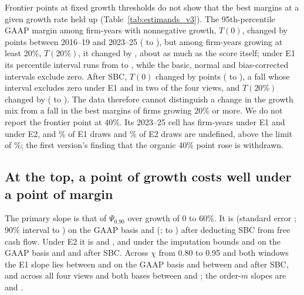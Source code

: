 Frontier points at fixed growth thresholds do not show that the best margins at a given growth rate held up (Table~\ref{tab:estimands_v3}). The 95th-percentile GAAP margin among firm-years with nonnegative growth, $T(0)$, changed by \TzeroOp{} points between 2016--19 and 2023--25 (\TzeroOpLo{} to \TzeroOpHi), but among firm-years growing at least 20\%, $T(20\%)$, it changed by \TtwentyOp{}, about as much as the score itself; under E1 its percentile interval runs from \TtwentyOpLo{} to \TtwentyOpHi, while the basic, normal and bias-corrected intervals exclude zero. After SBC, $T(0)$ changed by \TzeroCash{} points (\TzeroCashLo{} to \TzeroCashHi), a fall whose interval excludes zero under E1 and in two of the four views, and $T(20\%)$ changed by \TtwentyCash{} (\TtwentyCashLo{} to \TtwentyCashHi). The data therefore cannot distinguish a change in the growth mix from a fall in the best margins of firms growing 20\% or more. We do not report the frontier point at 40\%. Its 2023--25 cell has \FortyCellLate{} firm-years under E1 and \FortyCellLateEtwo{} under E2, and \FortyNanEone\% of E1 draws and \FortyNanEtwo\% of E2 draws are undefined, above the limit of \BootNanMax\%; the first version's finding that the organic 40\% point rose is withdrawn.

\subsection{At the top, a point of growth costs well under a point of margin}
The primary slope is that of $\Psi_{0.90}$ over growth of 0 to 60\%. It is \PsiOpEone{} (standard error \PsiOpEoneSe; 90\% interval \PsiOpEoneLo{} to \PsiOpEoneHi) on the GAAP basis and \PsiCashEone{} (\PsiCashEoneSe; \PsiCashEoneLo{} to \PsiCashEoneHi) after deducting SBC from free cash flow. Under E2 it is \PsiOpEtwo{} and \PsiCashEtwo, and under the imputation bounds \PsiOpImpFour{} and \PsiOpImpEight{} on the GAAP basis and \PsiCashImpFour{} and \PsiCashImpEight{} after SBC. Across $\chi$ from 0.80 to 0.95 and both windows the E1 slope lies between \PsiGridOpLo{} and \PsiGridOpHi{} on the GAAP basis and between \PsiGridCashLo{} and \PsiGridCashHi{} after SBC, and across all four views and both bases between \PsiGridAllOpLo{} and \PsiGridAllCashHi; the order-$m$ slopes are \OrderMOp{} and \OrderMCash.

